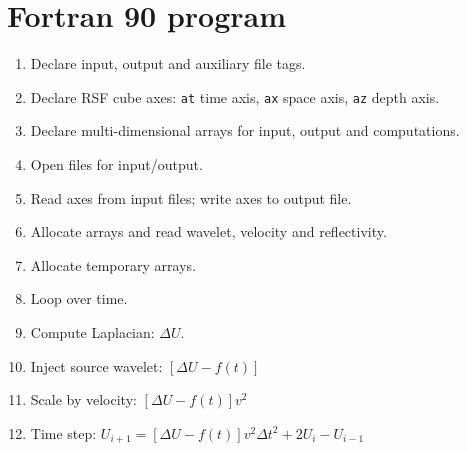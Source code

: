 \section{Fortran 90 program}
\lstset{language=fortran,numbers=left,numberstyle=\tiny,showstringspaces=false}
\renewcommand{\rsfafdm}{\RSF/api/f90/test/afdm.f90}

\tiny

\normalsize
\newpage

\begin{enumerate}
\item Declare input, output and auxiliary file tags.
\tiny

\normalsize

\item Declare RSF cube axes:
\texttt{at} time axis,
\texttt{ax} space axis,
\texttt{az} depth axis.
\tiny

\normalsize

\item Declare multi-dimensional arrays for input, output and computations.
\tiny

\normalsize

\item Open files for input/output.
\tiny

\normalsize

\item Read axes from input files; write axes to output file.
\tiny

\normalsize

\item Allocate arrays and read wavelet, velocity and reflectivity.
\tiny

\normalsize

\item Allocate temporary arrays.
\tiny

\normalsize

\item Loop over time.
\tiny

\normalsize

\item Compute Laplacian: $\Delta U$.
\tiny

\normalsize

\item Inject source wavelet: $\left[ \Delta U - f(t) \right]$
\tiny

\normalsize

\item Scale by velocity: $\left[ \Delta U - f(t) \right] v^2$
\tiny

\normalsize

\item Time step: 
$U_{i+1} = \left[ \Delta U -f(t) \right] v^2 \Delta t^2 + 2 U_{i} - U_{i-1}$
\tiny

\normalsize

\end{enumerate}

